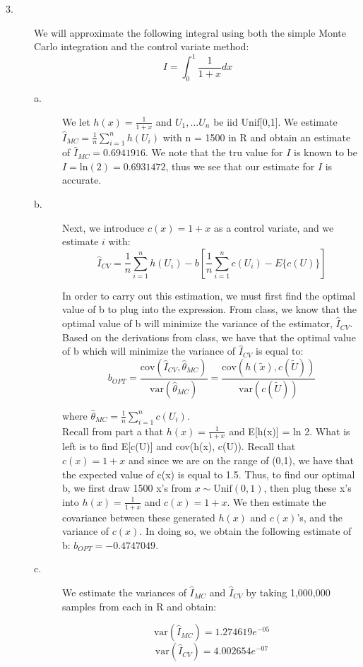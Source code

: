 \documentclass[12pt]{article}
\begin{document}
\begin{description}
\item[3.] We will approximate the following integral using both the simple Monte Carlo integration and the control variate method:
\[I = \int_0^1 \frac{1}{1 + x} dx\]

\begin{description}
\item[a.]We let $h(x) = \frac{1}{1+x}$ and $U_1, \dots U_n$ be iid Unif[0,1]. We estimate $\hat{I}_{MC} = \frac{1}{n} \sum_{i = 1}^n h(U_i)$ with n = 1500 in R and obtain an estimate of $\hat{I}_{MC} = 0.6941916$. We note that the tru value for $I$ is known to be $I = \mathrm{ln}(2) = 0.6931472$, thus we see that our estimate for $I$ is accurate. 
\item[b.] Next, we introduce $c(x) = 1 + x$ as a control variate, and we estimate $i$ with:
\[\hat{I}_{CV} = \frac{1}{n} \sum_{i = 1}^n h(U_i) - b \left[ \frac{1}{n} \sum_{i = 1}^n c(U_i) - E\{c(U)\} \right]\]

In order to carry out this estimation, we must first find the optimal value of b to plug into the expression. From class, we know that the optimal value of b will minimize the variance of the estimator, $\hat{I}_{CV}$. Based on the derivations from class, we have that the optimal value of b which will minimize the variance of  $\hat{I}_{CV}$ is equal to:
\[b_{OPT} = \frac{\mathrm{cov}(\hat{I}_{CV}, \hat{\theta}_{MC})}{\mathrm{var}(\hat{\theta}_{MC})} = \frac{\mathrm{cov}(h(\tilde{x}), c(\tilde{U}))}{\mathrm{var}(c(\tilde{U}))} \]

where $\hat{\theta}_{MC} = \frac{1}{n} \sum_{i = 1}^n c(U_i)$.\\

Recall from part a that $h(x)  = \frac{1}{1 + x}$ and E[h(x)] = ln 2. What is left is to find E[c(U)] and cov(h(x), c(U)). Recall that $c(x) = 1 + x$ and since we are on the range of (0,1), we have that the expected value of c(x) is equal to 1.5. Thus, to find our optimal b, we first draw 1500 x's from $x \sim \mathrm{Unif}(0, 1)$, then plug these x's into $h(x) = \frac{1}{1 + x}$ and $c(x) = 1 + x$. We then estimate the covariance between these generated $h(x)$ and $c(x)$'s, and the variance of $c(x)$. In doing so, we obtain the following estimate of b: $b_{OPT} = -0.4747049$. 

\item[c.] We estimate the variances of $\hat{I}_{MC}$ and $\hat{I}_{CV}$ by taking 1,000,000 samples from each in R and obtain:

 \[\mathrm{var}(\hat{I}_{MC}) = 1.274619e^{-05}\] 
\[\mathrm{var}(\hat{I}_{CV}) = 4.002654e^{-07}\]


\end{description}
\end{description}
\end{document}
